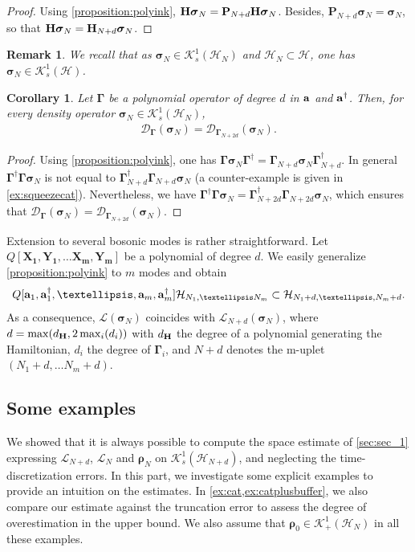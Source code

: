\documentclass[a4paper,onecolumn,amsmath,amssymb,amsfonts,accepted=2026-03-06]{quantumarticle}
\newcommand{\xL}{\mathcal{L}}
\newcommand{\xH}{\mathcal{H}}
\newcommand{\xK}{\mathcal{K}}
\newcommand{\cD}{\mathcal D}
\newcommand{\LL}{{\mathbf{\Gamma}}}
\newcommand{\Hamil}{{\bf H}}
\newcommand{\Proj}[1]{\mathbf{P}_{#1}}
\newcommand{\destroy}{{\bf a}}
\newcommand{\create}{{\bf a^\dag}}
\newtheorem{remark}{Remark}
\newtheorem{corollary}{Corollary}
\begin{document}
\begin{proof}
    Using \cref{proposition:polyink}, $\Hamil\boldsymbol{\sigma}_N=\Proj{N+d}\Hamil\boldsymbol{\sigma}_N$. Besides, $\Proj{N+d}\boldsymbol{\sigma}_N=\boldsymbol{\sigma}_N$, so that $\Hamil\boldsymbol{\sigma}_N= \Hamil_{N+d}\boldsymbol{\sigma}_N$.
\end{proof}
\begin{remark}

    We recall that as $\boldsymbol{\sigma}_N\in \xK_s^1(\xH_N)$ and $\xH_N\subset \xH$, one has $\boldsymbol{\sigma}_N\in \xK_s^1(\xH)$.
\end{remark}
\begin{corollary}
    \label{co:dissipator}
    Let $\LL$ be a polynomial operator of degree $d$ in $\destroy$ and $\create$. Then, for every density operator $\boldsymbol{\sigma}_N\in \xK_s^1(\xH_N)$,
    \begin{align}
        \cD_{\LL}(\boldsymbol{\sigma}_N)=\cD_{\LL_{N+2d}}(\boldsymbol{\sigma}_N).
    \end{align}
\end{corollary}
\begin{proof}
    Using \cref{proposition:polyink}, one has $\LL \boldsymbol{\sigma}_N \LL^\dag =\LL_{N+d}\boldsymbol{\sigma}_N \LL_{N+d}^\dag$. In general $\LL^\dag \LL \boldsymbol{\sigma}_N$ is not equal to $\LL_{N+d}^\dag \LL_{N+d}\boldsymbol{\sigma}_N$ (a counter-example is given in \cref{ex:squeezecat}). Nevertheless, we have $\LL^\dag \LL \boldsymbol{\sigma}_N=\LL_{N+2d}^\dag \LL_{N+2d}\boldsymbol{\sigma}_N$, which ensures that $\cD_{\LL}(\boldsymbol{\sigma}_N)=\cD_{\LL_{N+2d}}(\boldsymbol{\sigma}_N)$.
\end{proof}

Extension to several bosonic modes is rather straightforward. Let ${Q}[\mathbf{X_1},\mathbf{Y_1},\ldots \mathbf{X_m},\mathbf{Y_m}]$ be a polynomial of degree $d$. We easily generalize \cref{proposition:polyink} to $m$ modes and obtain
\begin{align}
    {Q}[\destroy_1,\destroy^\dag_1,\ldots, \destroy_m,\destroy^\dag_m]\xH_{N_1,\ldots N_m} \subset \xH_{N_1+d,\ldots, N_m+d}.
\end{align}
As a consequence, $\xL(\boldsymbol{\sigma}_N)$ coincides with $\xL_{N+d}(\boldsymbol{\sigma}_N)$, where $d=\max(d_{\Hamil}, 2\max_i(d_{i}))$ with $d_{\Hamil}$ the degree of a polynomial generating the Hamiltonian, $d_i$ the degree of $\LL_i$, and $N+d$ denotes the m-uplet $(N_1+d,\ldots N_m+d)$.

\subsection{Some examples}
We showed that it is always possible to compute the space estimate of \cref{sec:sec_1} expressing $\xL_{N+d}$, $\xL_N$ and $\boldsymbol{\rho}_N$ on $\xK_ s^1(\xH_{N+d})$, and neglecting the time-discretization errors.
In this part, we investigate some explicit examples to provide an intuition on the estimates. In \cref{ex:cat,ex:catplusbuffer}, we also compare our estimate against the truncation error to assess the degree of overestimation in the upper bound. We also assume that $\boldsymbol{\rho}_0\in \xK^1_+(\xH_N)$ in all these examples.
\end{document}
